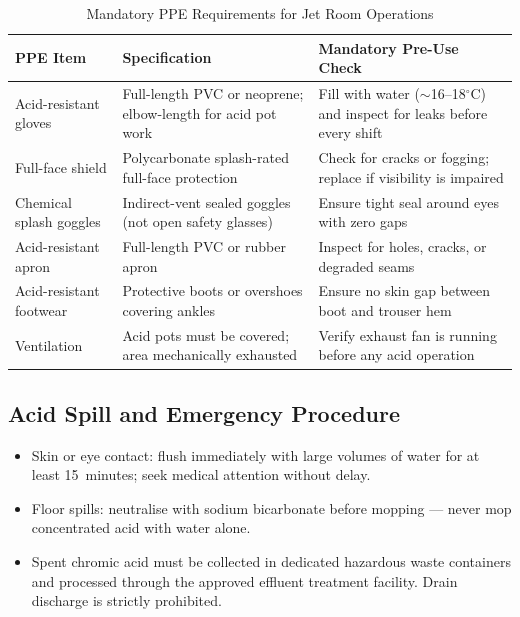 \documentclass{book}
\begin{document}
\begin{table}[H]
  \centering
  \caption{Mandatory PPE Requirements for Jet Room Operations}
  \label{tab:ppe}
  \begin{tabular}{L{3.5cm} L{5cm} L{5cm}}
    \toprule
    \color{white}\textbf{PPE Item} &
    \color{white}\textbf{Specification} &
    \color{white}\textbf{Mandatory Pre-Use Check} \\
    \midrule
    Acid-resistant gloves  & Full-length PVC or neoprene; elbow-length for acid pot work & Fill with water ($\sim$16--18$^\circ$C) and inspect for leaks before every shift \\
    Full-face shield       & Polycarbonate splash-rated full-face protection & Check for cracks or fogging; replace if visibility is impaired \\
    Chemical splash goggles & Indirect-vent sealed goggles (not open safety glasses) & Ensure tight seal around eyes with zero gaps \\
    Acid-resistant apron   & Full-length PVC or rubber apron & Inspect for holes, cracks, or degraded seams \\
    Acid-resistant footwear & Protective boots or overshoes covering ankles & Ensure no skin gap between boot and trouser hem \\
    Ventilation            & Acid pots must be covered; area mechanically exhausted & Verify exhaust fan is running before any acid operation \\
    \bottomrule
  \end{tabular}
\end{table}

\subsection{Acid Spill and Emergency Procedure}

\begin{itemize}[leftmargin=1.5em]
  \item Skin or eye contact: flush immediately with large volumes of water for at least 15~minutes; seek medical attention without delay.
  \item Floor spills: neutralise with sodium bicarbonate before mopping --- never mop concentrated acid with water alone.
  \item Spent chromic acid must be collected in dedicated hazardous waste containers and processed through the approved effluent treatment facility. Drain discharge is strictly prohibited.
\end{itemize}
\end{document}
